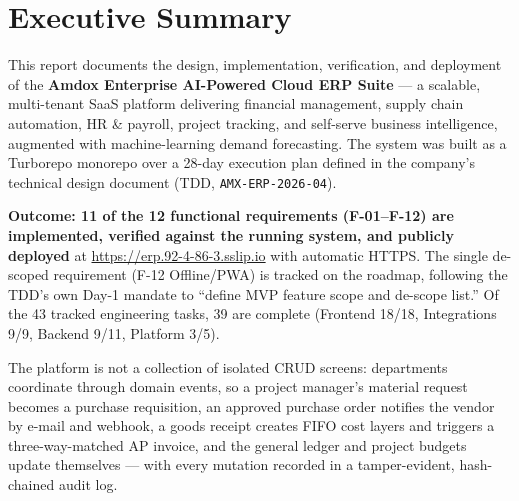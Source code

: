 \documentclass[11pt,a4paper]{article}
\newcommand{\code}[1]{\texttt{\small #1}}
\newcommand{\liveurl}{\url{https://erp.92-4-86-3.sslip.io}}
\begin{document}
{\hypersetup{linkcolor=amdoxnavy}\tableofcontents}
\vspace{0.6cm}
\newpage

\section{Executive Summary}

This report documents the design, implementation, verification, and deployment of the
\textbf{Amdox Enterprise AI-Powered Cloud ERP Suite} --- a scalable, multi-tenant SaaS
platform delivering financial management, supply chain automation, HR \& payroll,
project tracking, and self-serve business intelligence, augmented with machine-learning
demand forecasting. The system was built as a Turborepo monorepo over a 28-day execution
plan defined in the company's technical design document (TDD, \code{AMX-ERP-2026-04}).

\textbf{Outcome: 11 of the 12 functional requirements (F-01--F-12) are implemented,
verified against the running system, and publicly deployed} at \liveurl{} with automatic
HTTPS. The single de-scoped requirement (F-12 Offline/PWA) is tracked on the roadmap,
following the TDD's own Day-1 mandate to ``define MVP feature scope and de-scope list.''
Of the 43 tracked engineering tasks, 39 are complete (Frontend 18/18, Integrations 9/9,
Backend 9/11, Platform 3/5).

The platform is not a collection of isolated CRUD screens: departments coordinate through
domain events, so a project manager's material request becomes a purchase requisition,
an approved purchase order notifies the vendor by e-mail and webhook, a goods receipt
creates FIFO cost layers and triggers a three-way-matched AP invoice, and the general
ledger and project budgets update themselves --- with every mutation recorded in a
tamper-evident, hash-chained audit log.
\end{document}

